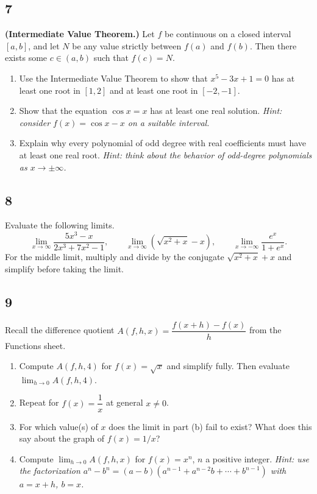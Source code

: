 \documentclass[11pt,oneside,reqno]{amsbook}
\numberwithin{equation}{section}
\theoremstyle{definition}
\theoremstyle{remark}
\begin{document}
\subsection*{7} \textbf{(Intermediate Value Theorem.)} Let $f$ be continuous on a closed interval $[a, b]$, and let $N$ be any value strictly between $f(a)$ and $f(b)$. Then there exists some $c \in (a,b)$ such that $f(c) = N$.
\begin{enumerate}[label=(\alph*)]
    \item Use the Intermediate Value Theorem to show that $x^5 - 3x + 1 = 0$ has at least one root in $[1, 2]$ and at least one root in $[-2, -1]$.
    \item Show that the equation $\cos x = x$ has at least one real solution.
    \textit{Hint: consider $f(x) = \cos x - x$ on a suitable interval.}
    \item Explain why every polynomial of odd degree with real coefficients must have at least one real root.
    \textit{Hint: think about the behavior of odd-degree polynomials as $x \to \pm\infty$.}
\end{enumerate}

\subsection*{8} Evaluate the following limits.
\[
\lim_{x \to \infty} \frac{5x^3 - x}{2x^3 + 7x^2 - 1}, \qquad
\lim_{x \to \infty}\!\left(\sqrt{x^2+x} - x\right), \qquad
\lim_{x \to -\infty} \frac{e^x}{1 + e^x}.
\]
For the middle limit, multiply and divide by the conjugate $\sqrt{x^2+x}+x$ and simplify before taking the limit.

\subsection*{9} Recall the difference quotient $A(f, h, x) = \dfrac{f(x+h)-f(x)}{h}$ from the Functions sheet.
\begin{enumerate}[label=(\alph*)]
    \item Compute $A(f, h, 4)$ for $f(x) = \sqrt{x}$ and simplify fully. Then evaluate $\displaystyle\lim_{h \to 0} A(f, h, 4)$.
    \item Repeat for $f(x) = \dfrac{1}{x}$ at general $x \neq 0$.
    \item For which value(s) of $x$ does the limit in part (b) fail to exist? What does this say about the graph of $f(x) = 1/x$?
    \item Compute $\displaystyle\lim_{h \to 0} A(f, h, x)$ for $f(x) = x^n$, $n$ a positive integer.
    \textit{Hint: use the factorization $a^n - b^n = (a-b)(a^{n-1}+a^{n-2}b + \cdots + b^{n-1})$ with $a = x+h$, $b = x$.}
\end{enumerate}
\end{document}
